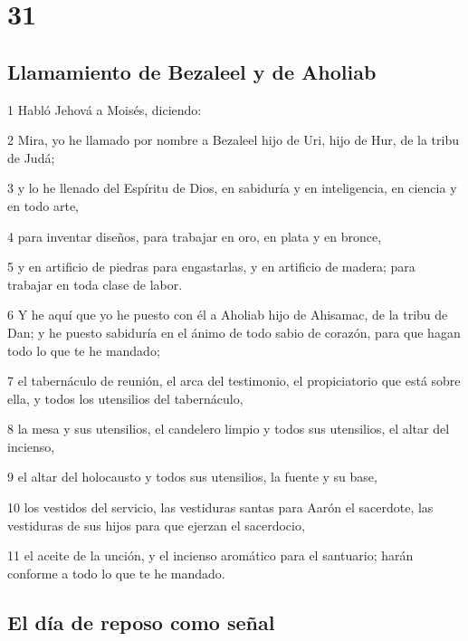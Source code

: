 \chapter{31}

\section*{Llamamiento de Bezaleel y de Aholiab}

\par 1 Habló Jehová a Moisés, diciendo:
\par 2 Mira, yo he llamado por nombre a Bezaleel hijo de Uri, hijo de Hur, de la tribu de Judá;
\par 3 y lo he llenado del Espíritu de Dios, en sabiduría y en inteligencia, en ciencia y en todo arte,
\par 4 para inventar diseños, para trabajar en oro, en plata y en bronce,
\par 5 y en artificio de piedras para engastarlas, y en artificio de madera; para trabajar en toda clase de labor.
\par 6 Y he aquí que yo he puesto con él a Aholiab hijo de Ahisamac, de la tribu de Dan; y he puesto sabiduría en el ánimo de todo sabio de corazón, para que hagan todo lo que te he mandado;
\par 7 el tabernáculo de reunión, el arca del testimonio, el propiciatorio que está sobre ella, y todos los utensilios del tabernáculo,
\par 8 la mesa y sus utensilios, el candelero limpio y todos sus utensilios, el altar del incienso,
\par 9 el altar del holocausto y todos sus utensilios, la fuente y su base,
\par 10 los vestidos del servicio, las vestiduras santas para Aarón el sacerdote, las vestiduras de sus hijos para que ejerzan el sacerdocio,
\par 11 el aceite de la unción, y el incienso aromático para el santuario; harán conforme a todo lo que te he mandado.

\section*{El día de reposo como señal}

